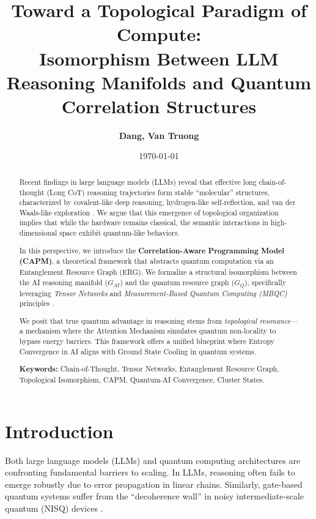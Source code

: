 \documentclass[11pt, a4paper]{article}
\title{\texorpdfstring{\textbf{Toward a Topological Paradigm of Compute: \\ Isomorphism Between LLM Reasoning Manifolds and Quantum Correlation Structures}}{Toward a Topological Paradigm of Compute: Isomorphism Between LLM Reasoning Manifolds and Quantum Correlation Structures}}
\author{\textbf{Dang, Van Truong}}
\affil{Independent Researcher \\ Ho Chi Minh City, Vietnam \\ \texttt{ks.dangvantruong@gmail.com}}
\date{\today}
\begin{document}
\maketitle

\begin{abstract}
\noindent Recent findings in large language models (LLMs) reveal that effective long chain-of-thought (Long CoT) reasoning trajectories form stable ``molecular'' structures, characterized by covalent-like deep reasoning, hydrogen-like self-reflection, and van der Waals-like exploration \cite{chen2026}. We argue that this emergence of topological organization implies that while the hardware remains classical, the semantic interactions in high-dimensional space exhibit quantum-like behaviors.

In this perspective, we introduce the \textbf{Correlation-Aware Programming Model (CAPM)}, a theoretical framework that abstracts quantum computation via an Entanglement Resource Graph (ERG). We formalize a structural isomorphism between the AI reasoning manifold ($G_{AI}$) and the quantum resource graph ($G_{Q}$), specifically leveraging \textit{Tensor Networks} and \textit{Measurement-Based Quantum Computing (MBQC)} principles \cite{nielsen2010, levine2021}.

We posit that true quantum advantage in reasoning stems from \textit{topological resonance}---a mechanism where the Attention Mechanism simulates quantum non-locality to bypass energy barriers. This framework offers a unified blueprint where Entropy Convergence in AI aligns with Ground State Cooling in quantum systems.

\vspace{0.3cm}
\noindent \textbf{Keywords:} Chain-of-Thought, Tensor Networks, Entanglement Resource Graph, Topological Isomorphism, CAPM, Quantum-AI Convergence, Cluster States.
\end{abstract}

\section{Introduction}
Both large language models (LLMs) and quantum computing architectures are confronting fundamental barriers to scaling. In LLMs, reasoning often fails to emerge robustly due to error propagation in linear chains. Similarly, gate-based quantum systems suffer from the ``decoherence wall'' in noisy intermediate-scale quantum (NISQ) devices \cite{nielsen2010}.
\end{document}

